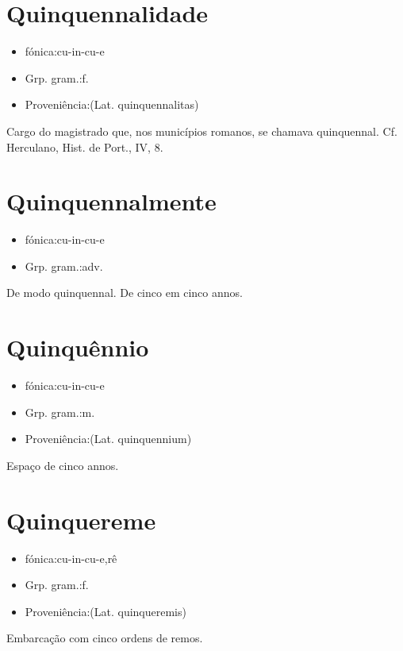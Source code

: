 \section{Quinquennalidade}
\begin{itemize}
\item {fónica:cu-in-cu-e}
\end{itemize}
\begin{itemize}
\item {Grp. gram.:f.}
\end{itemize}
\begin{itemize}
\item {Proveniência:(Lat. \textunderscore quinquennalitas\textunderscore )}
\end{itemize}
Cargo do magistrado que, nos municípios romanos, se chamava quinquennal. Cf. Herculano, \textunderscore Hist. de Port.\textunderscore , IV, 8.
\section{Quinquennalmente}
\begin{itemize}
\item {fónica:cu-in-cu-e}
\end{itemize}
\begin{itemize}
\item {Grp. gram.:adv.}
\end{itemize}
De modo quinquennal.
De cinco em cinco annos.
\section{Quinquênnio}
\begin{itemize}
\item {fónica:cu-in-cu-e}
\end{itemize}
\begin{itemize}
\item {Grp. gram.:m.}
\end{itemize}
\begin{itemize}
\item {Proveniência:(Lat. \textunderscore quinquennium\textunderscore )}
\end{itemize}
Espaço de cinco annos.
\section{Quinquereme}
\begin{itemize}
\item {fónica:cu-in-cu-e,rê}
\end{itemize}
\begin{itemize}
\item {Grp. gram.:f.}
\end{itemize}
\begin{itemize}
\item {Proveniência:(Lat. \textunderscore quinqueremis\textunderscore )}
\end{itemize}
Embarcação com cinco ordens de remos.
